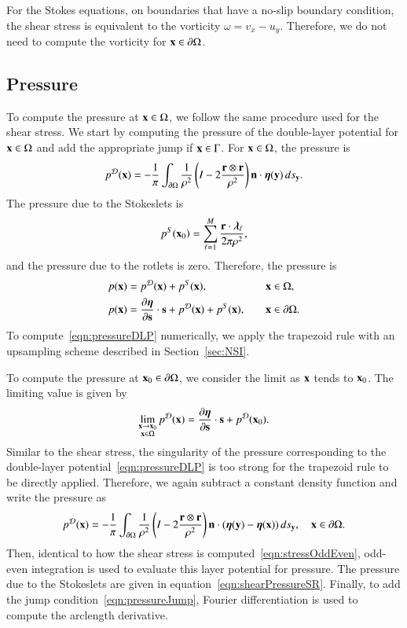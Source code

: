 \documentclass[preprint, 10pt]{elsarticle}
\begin{document}
For the Stokes equations, on boundaries that have a no-slip boundary
condition, the shear stress is equivalent to the vorticity $\omega = v_x -
u_y$.  Therefore, we do not need to compute the vorticity for ${\mathbf{x}} \in
{\partial}\Omega$.

\subsection{Pressure}
\label{sec:pressure}
To compute the pressure at ${\mathbf{x}} \in \Omega$, we follow the
same procedure used for the shear stress.  We start by computing the
pressure of the double-layer potential for ${\mathbf{x}} \in \Omega$ and add the
appropriate jump if ${\mathbf{x}} \in \Gamma$. For ${\mathbf{x}} \in \Omega$, the pressure
is
\begin{align}
  p^{{\mathcal{D}}}({\mathbf{x}}) = -\frac{1}{\pi}\int_{{\partial}\Omega} \frac{1}{\rho^2}
    \left(I - 2 \frac{{\mathbf{r}} \otimes {\mathbf{r}}}{\rho^2}\right) 
    {\mathbf{n}} \cdot {\boldsymbol\eta}({\mathbf{y}}) \,ds_{\mathbf{y}}.
    \label{eqn:pressureDLP}
\end{align}
The pressure due to the Stokeslets is
\begin{align}
  p^S({\mathbf{x}}_0) = \sum_{\ell=1}^{M}\frac{{\mathbf{r}} \cdot {\boldsymbol\lambda}_\ell}{2\pi\rho^2},
  \label{eqn:shearPressureSR}
\end{align}
and the pressure due to the rotlets is zero.  Therefore, the pressure is
\begin{alignat*}{3}
  p({\mathbf{x}}) &= p^{{\mathcal{D}}}({\mathbf{x}}) + p^{S}({\mathbf{x}}), &&{\mathbf{x}} \in \Omega,\\
  p({\mathbf{x}}) &= \frac{\partial {\boldsymbol\eta}}{\partial {\mathbf{s}}} \cdot {\mathbf{s}} + p^{{\mathcal{D}}}({\mathbf{x}}) + 
              p^{S}({\mathbf{x}}), \quad && {\mathbf{x}} \in {\partial}\Omega.
\end{alignat*}
To compute~\eqref{eqn:pressureDLP} numerically, we apply the trapezoid
rule with an upsampling scheme described in Section~\ref{sec:NSI}.

To compute the pressure at ${\mathbf{x}}_0 \in {\partial}\Omega$, we consider the limit
as ${\mathbf{x}}$ tends to ${\mathbf{x}}_0$.  The limiting value is given
by~\cite{qua-bir2014a}
\begin{align}
  \lim_{\substack{{\mathbf{x}} \rightarrow {\mathbf{x}}_0 \\ {\mathbf{x}} \in \Omega}}p^{\mathcal{D}}({\mathbf{x}}) =  
    \frac{\partial {\boldsymbol\eta}}{\partial {\mathbf{s}}} \cdot {\mathbf{s}} + p^{{\mathcal{D}}}({\mathbf{x}}_0).
  \label{eqn:pressureJump}
\end{align}
Similar to the shear stress, the singularity of the pressure
corresponding to the double-layer potential~\eqref{eqn:pressureDLP} is
too strong for the trapezoid rule to be directly applied.  Therefore, we
again subtract a constant density function and write the pressure as
\begin{align*}
  p^{\mathcal{D}}({\mathbf{x}}) = -\frac{1}{\pi}\int_{{\partial}\Omega} \frac{1}{\rho^2}
    \left(I - 2 \frac{{\mathbf{r}} \otimes {\mathbf{r}}}{\rho^2}\right) 
    {\mathbf{n}} \cdot ({\boldsymbol\eta}({\mathbf{y}}) - {\boldsymbol\eta}({\mathbf{x}})) \,ds_{\mathbf{y}}, 
    \quad {\mathbf{x}} \in {\partial}\Omega.
\end{align*}
Then, identical to how the shear stress is
computed~\eqref{eqn:stressOddEven}, odd-even integration is used to
evaluate this layer potential for pressure.  The pressure due to the
Stokeslets are given in equation~\eqref{eqn:shearPressureSR}.  Finally,
to add the jump condition~\eqref{eqn:pressureJump}, Fourier
differentiation is used to compute the arclength derivative. 
\end{document}

